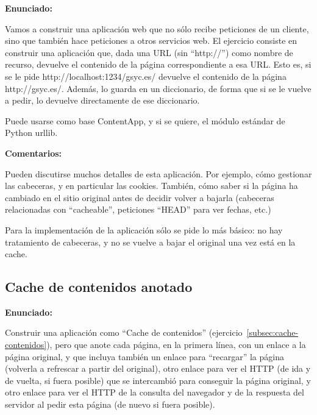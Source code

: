 \textbf{Enunciado:}

Vamos a construir una aplicación web que no sólo recibe peticiones de un cliente, sino que también hace peticiones a otros servicios web. El ejercicio consiste en construir una aplicación que, dada una URL (sin ``http://'') como nombre de recurso, devuelve el contenido de la página correspondiente a esa URL. Esto es, si se le pide http://localhost:1234/gsyc.es/ devuelve el contenido de la página http://gsyc.es/. Además, lo guarda en un diccionario, de forma que si se le vuelve a pedir, lo devuelve directamente de ese diccionario.

Puede usarse como base ContentApp, y si se quiere, el módulo estándar de Python urllib.

\textbf{Comentarios:}

Pueden discutirse muchos detalles de esta aplicación. Por ejemplo, cómo gestionar las cabeceras, y en particular las cookies. También, cómo saber si la página ha cambiado en el sitio original antes de decidir volver a bajarla (cabeceras relacionadas con ``cacheable'', peticiones ``HEAD'' para ver fechas, etc.)

Para la implementación de la aplicación sólo se pide lo más básico: no hay tratamiento de cabeceras, y no se vuelve a bajar el original una vez está en la cache.

\subsection{Cache de contenidos anotado}
\label{subsec:cache-contenidos-anotado}

\textbf{Enunciado:}

Construir una aplicación como ``Cache de contenidos'' (ejercicio~\ref{subsec:cache-contenidos}), pero que anote cada página, en la primera línea, con un enlace a la página original, y que incluya también un enlace para ``recargar'' la página (volverla a refrescar a partir del original), otro enlace para ver el HTTP (de ida y de vuelta, si fuera posible) que se intercambió para conseguir la página original, y otro enlace para ver el HTTP de la consulta del navegador y de la respuesta del servidor al pedir esta página (de nuevo si fuera posible).

